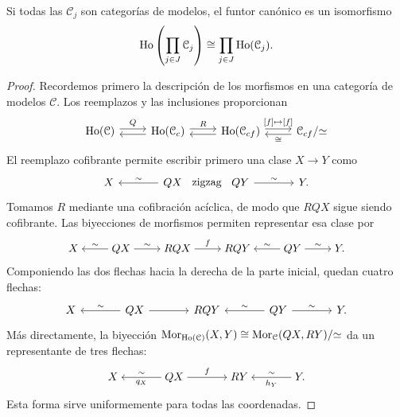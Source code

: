 \begin{prop}\label{prop:c15-localizacion-productos}
Si todas las $\mathcal C_j$ son categorías de modelos, el funtor canónico es un isomorfismo
\[
\operatorname{Ho}\left(\prod_{j\in J}\mathcal C_j\right)\cong\prod_{j\in J}\operatorname{Ho}(\mathcal C_j).
\]
\end{prop}
\begin{proof}
Recordemos primero la descripción de los morfismos en una categoría de modelos $\mathcal C$. Los reemplazos y las inclusiones proporcionan
\[
\begin{tikzcd}[column sep=normal,row sep=large]
\Ho(\mathcal C) \arrow[r,shift left,"Q"]
& \Ho(\mathcal C_c) \arrow[l,shift left] \arrow[r,shift left,"R"]
& \Ho(\mathcal C_{cf}) \arrow[l,shift left] \arrow[r,shift left,"{[f]\mapsto[f]}"]
& \mathcal C_{cf}/{\simeq} \arrow[l,shift left,"\cong"]
\end{tikzcd}
\]
El reemplazo cofibrante permite escribir primero una clase $X\to Y$ como
\[
\begin{tikzcd}[column sep=large]
X & QX \arrow[l,"\sim"'] \arrow[r,phantom,"\text{zigzag}" description]
& QY \arrow[r,"\sim"] & Y.
\end{tikzcd}
\]
Tomamos $R$ mediante una cofibración acíclica, de modo que $RQX$ sigue siendo cofibrante. Las biyecciones de morfismos permiten representar esa clase por
\[
\begin{tikzcd}[cramped,column sep=normal]
X & QX \arrow[l,"\sim"'] \arrow[r,"\sim"] & RQX \arrow[r,"f"]
& RQY & QY \arrow[l,"\sim"'] \arrow[r,"\sim"] & Y.
\end{tikzcd}
\]
Componiendo las dos flechas hacia la derecha de la parte inicial, quedan cuatro flechas:
\[
\begin{tikzcd}[column sep=large]
X & QX \arrow[l,"\sim"'] \arrow[r]
& RQY & QY \arrow[l,"\sim"'] \arrow[r,"\sim"] & Y.
\end{tikzcd}
\] Más directamente, la biyección $\operatorname{Mor}_{\operatorname{Ho}(\mathcal C)}(X,Y)\cong\operatorname{Mor}_{\mathcal C}(QX,RY)/{\simeq}$ da un representante de tres flechas:
\[
\begin{tikzcd}[cramped,column sep=large]
X & QX \arrow[l,"q_X","\sim"'] \arrow[r,"f"]
& RY & Y \arrow[l,"h_Y","\sim"'].
\end{tikzcd}
\]
Esta forma sirve uniformemente para todas las coordenadas.


\end{proof}
